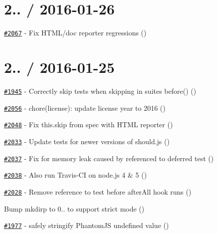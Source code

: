 \section*{2.. / 2016-\/01-\/26}


\begin{DoxyItemize}
\item \href{https://github.com/mochajs/mocha/pull/2067}{\tt \#2067} -\/ Fix H\+T\+M\+L/doc reporter regressions (\href{https://github.com/danielstjules}{\tt })
\end{DoxyItemize}

\section*{2.. / 2016-\/01-\/25}


\begin{DoxyItemize}
\item \href{https://github.com/mochajs/mocha/pull/1945}{\tt \#1945} -\/ Correctly skip tests when skipping in suite\textquotesingle{}s before() (\href{https://github.com/ryanshawty}{\tt })
\item \href{https://github.com/mochajs/mocha/pull/2056}{\tt \#2056} -\/ chore(license)\+: update license year to 2016 (\href{https://github.com/pra85}{\tt })
\item \href{https://github.com/mochajs/mocha/pull/2048}{\tt \#2048} -\/ Fix {\ttfamily this.\+skip} from spec with H\+T\+ML reporter (\href{https://github.com/mislav}{\tt })
\item \href{https://github.com/mochajs/mocha/pull/2033}{\tt \#2033} -\/ Update tests for newer versions of should.\+js (\href{https://github.com/tomhughes}{\tt })
\item \href{https://github.com/mochajs/mocha/pull/2037}{\tt \#2037} -\/ Fix for memory leak caused by referenced to deferred test (\href{https://github.com/bd82}{\tt })
\item \href{https://github.com/mochajs/mocha/pull/2038}{\tt \#2038} -\/ Also run Travis-\/\+CI on node.\+js 4 \& 5 (\href{https://github.com/bd82}{\tt })
\item \href{https://github.com/mochajs/mocha/pull/2028}{\tt \#2028} -\/ Remove reference to test before after\+All hook runs (\href{https://github.com/stonelgh}{\tt })
\item Bump mkdirp to 0.. to support strict mode (\href{https://github.com/danielstjules}{\tt })
\item \href{https://github.com/mochajs/mocha/pull/1977}{\tt \#1977} -\/ safely stringify Phantom\+JS undefined value (\href{https://github.com/ahamid}{\tt })

\end{DoxyItemize}
